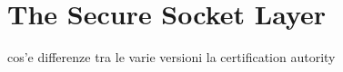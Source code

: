 \chapter{The Secure Socket Layer \label{chap:ssl}}


cos'e
differenze tra le varie versioni
la certification autority